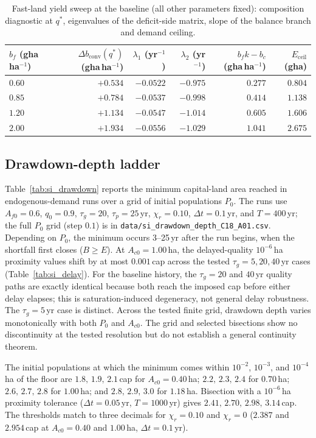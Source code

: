 \documentclass[11pt,a4paper]{article}
\newcommand{\dconv}{\Delta b_{\mathrm{conv}}}
\newcommand{\Eceil}{E_{\mathrm{ceil}}}
\begin{document}
\begin{table}[htbp]
\centering\small
\caption{Fast-land yield sweep at the baseline (all other parameters fixed): composition diagnostic at $q^*$, eigenvalues of the deficit-side matrix, slope of the balance branch and demand ceiling.}
\label{tab:si_sweep}
\begin{tabular}{l r r r r r}
\toprule
$b_f$ (gha\,ha$^{-1}$) & $\dconv(q^*)$ (gha\,ha$^{-1}$) & $\lambda_1$ (yr$^{-1}$) & $\lambda_2$ (yr$^{-1}$) & $b_fk-b_c$ (gha\,ha$^{-1}$) & $\Eceil$ (gha) \\
\midrule
$0.60$ & $+0.534$ & $-0.0522$ & $-0.975$ & $0.277$ & $0.804$ \\
$0.85$ & $+0.784$ & $-0.0537$ & $-0.998$ & $0.414$ & $1.138$ \\
$1.20$ & $+1.134$ & $-0.0547$ & $-1.014$ & $0.605$ & $1.606$ \\
$2.00$ & $+1.934$ & $-0.0556$ & $-1.029$ & $1.041$ & $2.675$ \\
\bottomrule
\end{tabular}
\end{table}

\subsection{Drawdown-depth ladder}\label{si:ladder}

Table~\ref{tab:si_drawdown} reports the minimum capital-land area reached in endogenous-demand runs over a grid of initial populations $P_0$. The runs use $A_{f0}=0.6$, $q_0=0.9$, $\tau_g=20$, $\tau_p=25$\,yr, $\chi_r=0.10$, $\Delta t=0.1$\,yr, and $T=400$\,yr; the full $P_0$ grid (step $0.1$) is in \texttt{data/si\_drawdown\_depth\_C18\_A01.csv}. Depending on $P_0$, the minimum occurs 3--25\,yr after the run begins, when the shortfall first closes ($B\ge E$). At $A_{c0}=1.00$\,ha, the delayed-quality $10^{-6}$\,ha proximity values shift by at most $0.001$\,cap across the tested $\tau_g=5,20,40$\,yr cases (Table~\ref{tab:si_delay}). For the baseline history, the $\tau_g=20$ and $40$\,yr quality paths are exactly identical because both reach the imposed cap before either delay elapses; this is saturation-induced degeneracy, not general delay robustness. The $\tau_g=5$\,yr case is distinct. Across the tested finite grid, drawdown depth varies monotonically with both $P_0$ and $A_{c0}$. The grid and selected bisections show no discontinuity at the tested resolution but do not establish a general continuity theorem.

The initial populations at which the minimum comes within $10^{-2}$, $10^{-3}$, and $10^{-4}$\,ha of the floor are $1.8,\,1.9,\,2.1$\,cap for $A_{c0}=0.40$\,ha; $2.2,\,2.3,\,2.4$ for $0.70$\,ha; $2.6,\,2.7,\,2.8$ for $1.00$\,ha; and $2.8,\,2.9,\,3.0$ for $1.18$\,ha. Bisection with a $10^{-6}$\,ha proximity tolerance ($\Delta t=0.05$\,yr, $T=1000$\,yr) gives $2.41,\,2.70,\,2.98,\,3.14$\,cap. The thresholds match to three decimals for $\chi_r=0.10$ and $\chi_r=0$ ($2.387$ and $2.954$\,cap at $A_{c0}=0.40$ and $1.00$\,ha, $\Delta t=0.1$\,yr). \par\pagebreak
\end{document}
